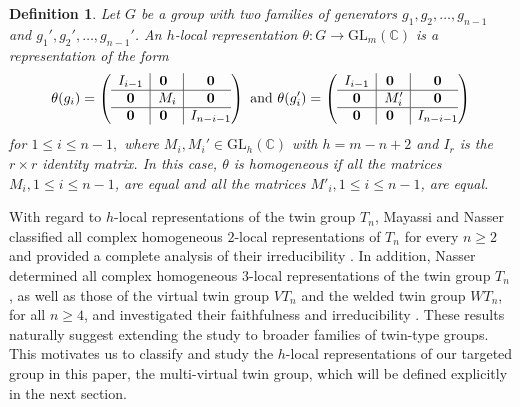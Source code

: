 \documentclass[preprint]{elsarticle}
\newtheorem{definition}[theorem]{Definition}
\begin{document}
\begin{definition}
Let $G$ be a group with two families of generators $g_1,g_2,\ldots,g_{n-1}$ and $g_1',g_2',\ldots,g_{n-1}'$. An $h$-local representation $\theta: G \longrightarrow \mathrm{GL}_{m}(\mathbb{C})$ is a representation of the form
$$\theta(g_i) =\left( \begin{array}{c|@{}c|c@{}}
   \begin{matrix}
     I_{i-1} 
   \end{matrix} 
      & \textbf{0} & \textbf{0} \\
      \hline
    \textbf{0} &\hspace{0.2cm} \begin{matrix}
   		M_i
   		\end{matrix}  & \textbf{0}  \\
\hline
\textbf{0} & \textbf{0} & I_{n-i-1}
\end{array} \right)
\text{ and } \theta(g'_i) =\left( \begin{array}{c|@{}c|c@{}}
   \begin{matrix}
     I_{i-1} 
   \end{matrix} 
      & \textbf{0} & \textbf{0} \\
      \hline
    \textbf{0} &\hspace{0.2cm} \begin{matrix}
   		M_i'
   		\end{matrix}  & \textbf{0}  \\
\hline
\textbf{0} & \textbf{0} & I_{n-i-1}
\end{array} \right) \vspace{0.5cm} $$
for $1\leq i\leq n-1,$ where $M_i,M_i' \in \mathrm{GL}_h(\mathbb{C})$ with $h=m-n+2$ and $I_r$ is the $r\times r$ identity matrix. In this case, $\theta$ is homogeneous if all the matrices \(M_i, 1 \leq i \leq n-1\), are equal and all the matrices \(M'_i, 1 \leq i \leq n-1\), are equal.
\end{definition}

With regard to $h$-local representations of the twin group $T_n$, Mayassi and Nasser classified all complex homogeneous $2$-local representations of $T_n$ for every $n \geq 2$ and provided a complete analysis of their irreducibility \cite{Mayasi20251}. In addition, Nasser determined all complex homogeneous $3$-local representations of the twin group $T_n$, as well as those of the virtual twin group $VT_n$ and the welded twin group $WT_n$, for all $n \geq 4$, and investigated their faithfulness and irreducibility \cite{Nasser202622}. These results naturally suggest extending the study to broader families of twin-type groups. This motivates us to classify and study the $h$-local representations of our targeted group in this paper, the multi-virtual twin group, which will be defined explicitly in the next section.
\end{document}
